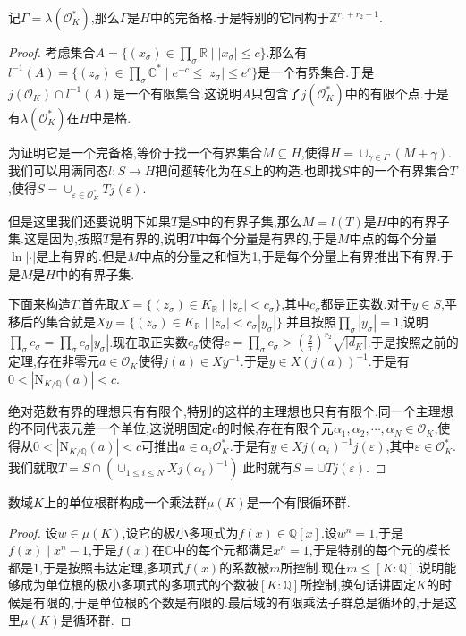记$\Gamma=\lambda(\mathscr{O}_K^*)$,那么$\Gamma$是$H$中的完备格.于是特别的它同构于$\mathbb{Z}^{r_1+r_2-1}$.
\begin{proof}
	
	考虑集合$A=\{(x_{\sigma})\in\prod_{\sigma}\mathbb{R}\mid |x_{\sigma}|\le c\}$.那么有$l^{-1}(A)=\{(z_{\sigma})\in\prod_{\sigma}\mathbb{C}^*\mid e^{-c}\le|z_{\sigma}|\le e^c\}$是一个有界集合.于是$j(\mathscr{O}_K)\cap l^{-1}(A)$是一个有限集合.这说明$A$只包含了$j(\mathscr{O}_K^*)$中的有限个点.于是有$\lambda(\mathscr{O}_K^*)$在$H$中是格.
	
	为证明它是一个完备格,等价于找一个有界集合$M\subseteq H$,使得$H=\cup_{\gamma\in\Gamma}(M+\gamma)$.我们可以用满同态$l:S\to H$把问题转化为在$S$上的构造.也即找$S$中的一个有界集合$T$,使得$S=\cup_{\varepsilon\in\mathscr{O}_K^*}Tj(\varepsilon)$.
	
	但是这里我们还要说明下如果$T$是$S$中的有界子集,那么$M=l(T)$是$H$中的有界子集.这是因为,按照$T$是有界的,说明$T$中每个分量是有界的,于是$M$中点的每个分量$\ln|\cdot|$是上有界的.但是$M$中点的分量之和恒为1,于是每个分量上有界推出下有界.于是$M$是$H$中的有界子集.
	
	下面来构造$T$.首先取$X=\{(z_{\sigma})\in K_{\mathbb{R}}\mid |z_{\sigma}|<c_{\sigma}\}$,其中$c_{\sigma}$都是正实数.对于$y\in S$,平移后的集合就是$Xy=\{(z_{\sigma})\in K_{\mathbb{R}}\mid |z_{\sigma}|<c_{\sigma}|y_{\sigma}|\}$.并且按照$\prod_{\sigma}|y_{\sigma}|=1$,说明$\prod_{\sigma}c_{\sigma}=\prod_{\sigma}c_{\sigma}|y_{\sigma}|$.现在取正实数$c_{\sigma}$使得$c=\prod_{\sigma}c_{\sigma}>\left(\frac{2}{\pi}\right)^{r_2}\sqrt{|d_K|}$.于是按照之前的定理,存在非零元$a\in\mathscr{O}_K$使得$j(a)\in Xy^{-1}$.于是$y\in X(j(a))^{-1}$.于是有$0<|\mathrm{N}_{K/\mathbb{Q}}(a)|<c$.
	
	绝对范数有界的理想只有有限个,特别的这样的主理想也只有有限个.同一个主理想的不同代表元差一个单位,这说明固定$c$的时候,存在有限个元$\alpha_1,\alpha_2,\cdots,\alpha_N\in\mathscr{O}_K$,使得从$0<|\mathrm{N}_{K/\mathbb{Q}}(a)|<c$可推出$a\in\alpha_i\mathscr{O}_K^*$.于是有$y\in Xj(\alpha_i)^{-1}j(\varepsilon)$,其中$\varepsilon\in\mathscr{O}_K^*$.我们就取$T=S\cap\left(\cup_{1\le i\le N}Xj(\alpha_i)^{-1}\right)$.此时就有$S=\cup Tj(\varepsilon)$.
\end{proof}

数域$K$上的单位根群构成一个乘法群$\mu(K)$是一个有限循环群.
\begin{proof}
	
	设$w\in\mu(K)$,设它的极小多项式为$f(x)\in\mathbb{Q}[x]$.设$w^n=1$,于是$f(x)\mid x^n-1$,于是$f(x)$在$\mathbb{C}$中的每个元都满足$x^n=1$,于是特别的每个元的模长都是1,于是按照韦达定理,多项式$f(x)$的系数被$m$所控制.现在$m\le[K:\mathbb{Q}]$.说明能够成为单位根的极小多项式的多项式的个数被$[K:\mathbb{Q}]$所控制,换句话讲固定$K$的时候是有限的,于是单位根的个数是有限的.最后域的有限乘法子群总是循环的,于是这里$\mu(K)$是循环群.
\end{proof}

